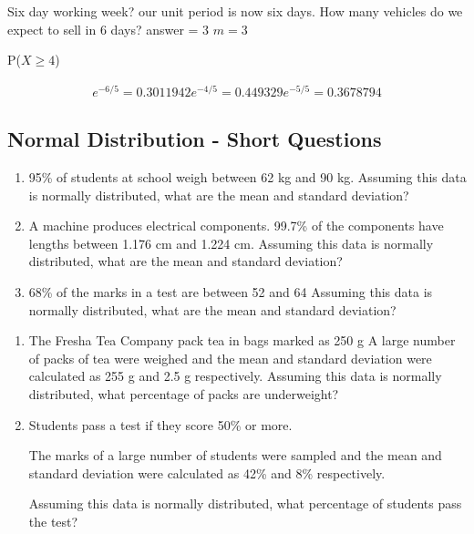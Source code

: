 \documentclass[]{report}
\begin{document}
Six day working week?
our unit period is now six days.
How many vehicles do we expect to sell in 6 days?
answer = 3
$m=3$

P($X\geq 4$)

\begin{eqnarray}
e^{-6/5} = 0.3011942
e^{-4/5} = 0.449329
e^{-5/5} = 0.3678794
\end{eqnarray}

\subsection{Normal Distribution - Short Questions}


\begin{enumerate}
	\item 95\% of students at school weigh between 62 kg and 90 kg.
	Assuming this data is normally distributed, what are the mean and standard deviation?
	
	\item A machine produces electrical components.
	99.7\% of the components have lengths between 1.176 cm and 1.224 cm.
	Assuming this data is normally distributed, what are the mean and standard deviation?
	
	\item 68\% of the marks in a test are between 52 and 64
	Assuming this data is normally distributed, what are the mean and standard deviation?
\end{enumerate}


\begin{enumerate}
	\item The Fresha Tea Company pack tea in bags marked as 250 g
	A large number of packs of tea were weighed and the mean and standard deviation were calculated as 255 g and 2.5 g respectively.
	Assuming this data is normally distributed, what percentage of packs are underweight?
	
	\item Students pass a test if they score 50\% or more.
	
	The marks of a large number of students were sampled and the mean and standard deviation were calculated as 42\% and 8\% respectively.
	
	Assuming this data is normally distributed, what percentage of students pass the test?
	
\end{enumerate}
\end{document}
